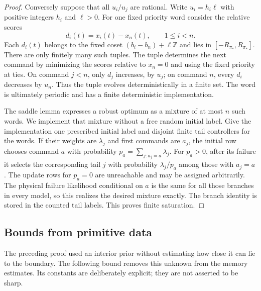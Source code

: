 \begin{proof}
Conversely suppose that all $u_i/u_j$ are rational.  Write
$u_i=h_i\ell$ with positive integers $h_i$ and $\ell>0$.
For one fixed priority word consider the relative scores
\[
 d_i(t)=x_i(t)-x_n(t),\qquad 1\le i<n.
\]
Each $d_i(t)$ belongs to the fixed coset
$(b_i-b_n)+\ell\mathbb Z$ and lies in
$[-R_{\pi_*},R_{\pi_*}]$.  There are only finitely many such tuples.
The tuple determines the next command by minimizing the scores
relative to $x_n=0$ and using the fixed priority at ties.  On command
$j<n$, only $d_j$ increases, by $u_j$; on command $n$, every $d_i$
decreases by $u_n$.  Thus the tuple evolves deterministically in a
finite set.  The word is ultimately periodic and has a finite
deterministic implementation.

The saddle lemma expresses a robust optimum as a mixture of at most
$n$ such words.  We implement that mixture without a free random
initial label.  Give the implementation one prescribed initial
label and disjoint finite tail controllers for the words.  If their
weights are $\lambda_j$ and first commands are $a_j$, the initial
row chooses command $a$ with probability
$p_a=\sum_{j:a_j=a}\lambda_j$.  For $p_a>0$, after its failure it
selects the corresponding tail $j$ with probability $\lambda_j/p_a$
among those with $a_j=a$.  The update rows for $p_a=0$ are unreachable
and may be assigned arbitrarily.  The physical failure likelihood conditional on $a$
is the same for all those branches in every model, so this realizes
the desired mixture exactly.  The branch identity is stored in the
counted tail labels.  This proves finite saturation.
\end{proof}

\subsection{Bounds from primitive data}

The preceding proof used an interior prior without estimating how
close it can lie to the boundary.  The following bound removes this
unknown from the memory estimates.  Its constants are deliberately
explicit; they are not asserted to be sharp.

